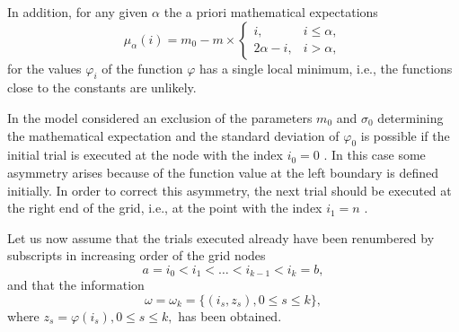 In addition,  for any given $\alpha$ the a priori mathematical expectations
\begin{displaymath}
\mu_\alpha(i) =m_0-m\times
  \begin{cases}
    i, & i\leq\alpha, \\
    2\alpha-i, & i>\alpha,
  \end{cases} 
\end{displaymath}
for the values $\varphi_i$  of the function $\varphi$  has a single local minimum, i.e., the functions close to the constants are unlikely.

In the model considered an exclusion of the parameters $m_0$  and $\sigma_0$  determining the mathematical expectation and the standard deviation of $\varphi_0$  is possible if the initial trial is executed at the node with the index $i_0=0$ . In this case some asymmetry arises because of the function value at the left boundary is defined initially. In order to correct this asymmetry, the next trial should be executed at the right end of the grid, i.e., at the point with the index $i_1=n$ .

Let us now assume that the trials executed already have been renumbered by subscripts in increasing order of the grid nodes 
\begin{equation}
\label{eq:2_7}
a=i_0<i_1<\ldots<i_{k-1}<i_k=b,
\end{equation}
and that the information
\begin{equation}
\label{eq:2_8}
\omega=\omega_k=\{(i_s,z_s),0\leq s\leq k\},
\end{equation}
where $z_s=\varphi(i_s),0\leq s\leq k,$  has been obtained.

